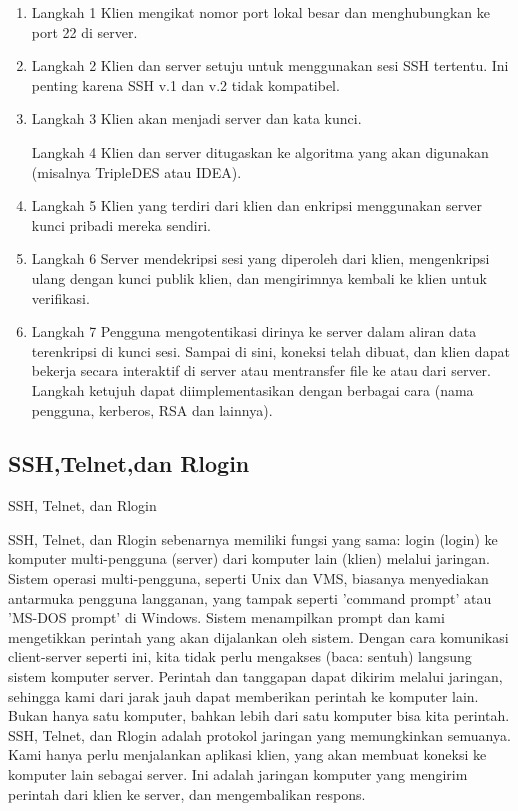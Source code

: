 \begin{enumerate}

	\item Langkah 1 
	Klien mengikat nomor port lokal besar dan menghubungkan ke port 22 di server.

	\item Langkah 2
	Klien dan server setuju untuk menggunakan sesi SSH tertentu. Ini penting karena SSH v.1 dan v.2 tidak kompatibel.

	\item Langkah 3
	Klien akan menjadi server dan kata kunci.

	\ietm Langkah 4
	Klien dan server ditugaskan ke algoritma yang akan digunakan (misalnya TripleDES atau IDEA).

	\item Langkah 5
	Klien yang terdiri dari klien dan enkripsi menggunakan server kunci pribadi mereka sendiri.

	\item Langkah 6
	Server mendekripsi sesi yang diperoleh dari klien, mengenkripsi ulang dengan kunci publik klien, dan mengirimnya kembali ke klien untuk verifikasi.

	\item Langkah 7
	Pengguna mengotentikasi dirinya ke server dalam aliran data terenkripsi di kunci sesi. Sampai di sini, koneksi telah dibuat, dan klien dapat bekerja secara interaktif di server atau mentransfer file ke atau dari server. Langkah ketujuh dapat diimplementasikan dengan berbagai cara (nama pengguna, kerberos, RSA dan lainnya).

\end{enumerate}
	
\subsection {SSH,Telnet,dan Rlogin}

SSH, Telnet, dan Rlogin

SSH, Telnet, dan Rlogin sebenarnya memiliki fungsi yang sama: login (login) ke komputer multi-pengguna (server) dari komputer lain (klien) melalui jaringan. Sistem operasi multi-pengguna, seperti Unix dan VMS, biasanya menyediakan antarmuka pengguna langganan, yang tampak seperti 'command prompt' atau 'MS-DOS prompt' di Windows. Sistem menampilkan prompt dan kami mengetikkan perintah yang akan dijalankan oleh sistem.
Dengan cara komunikasi client-server seperti ini, kita tidak perlu mengakses (baca: sentuh) langsung sistem komputer server. Perintah dan tanggapan dapat dikirim melalui jaringan, sehingga kami dari jarak jauh dapat memberikan perintah ke komputer lain. Bukan hanya satu komputer, bahkan lebih dari satu komputer bisa kita perintah.
SSH, Telnet, dan Rlogin adalah protokol jaringan yang memungkinkan semuanya. Kami hanya perlu menjalankan aplikasi klien, yang akan membuat koneksi ke komputer lain sebagai server. Ini adalah jaringan komputer yang mengirim perintah dari klien ke server, dan mengembalikan respons.

